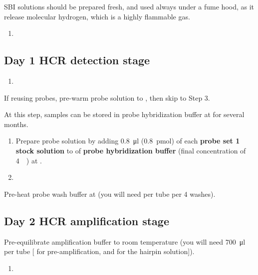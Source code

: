\documentclass[10pt]{report}
\begin{document}
\bigskip\alert{SBI solutions should be prepared fresh, and used always under a fume hood, as it release molecular hydrogen, which is a highly flammable gas.}

\begin{enumerate}[resume = steps]
	\item {}
\end{enumerate}


\subsection*{Day 1 \textendash{} HCR detection stage}
\begin{enumerate}[series = steps]
	\item {}
\end{enumerate}

\bigskip\alert{If reusing probes, pre-warm probe solution to \thirtysevendegree, then skip to Step 3.}

\alert{At this step, samples can be stored in probe hybridization buffer at \minustwenty{} for several months.}

\begin{enumerate}[resume = steps]
	\item Prepare probe solution by adding \qty{0.8}{\ul} (\qty{0.8}{\pmol}) of each \textbf{probe set \qty{1}{\micro\molar} stock solution} to \twohunmicrol{} of \textbf{probe hybridization buffer} (final concentration of \qty{4}{\nano\molar}) at \thirtysevendegree.\\
	\item {}
\end{enumerate}

\bigskip\alert{Pre-heat probe wash buffer at \thirtysevendegree{} (you will need \fivehunmicrol per tube per 4 washes).}


\subsection*{Day 2 \textendash{} HCR amplification stage}

\alert{Pre-equilibrate amplification buffer to room temperature (you will need \qty{700}{\ul} per tube [\fivehunmicrol{} for pre-amplification, and \twohunmicrol{} for the hairpin solution]).}
\begin{enumerate}[series = steps]
	\item {}
\end{enumerate}
\end{document}
